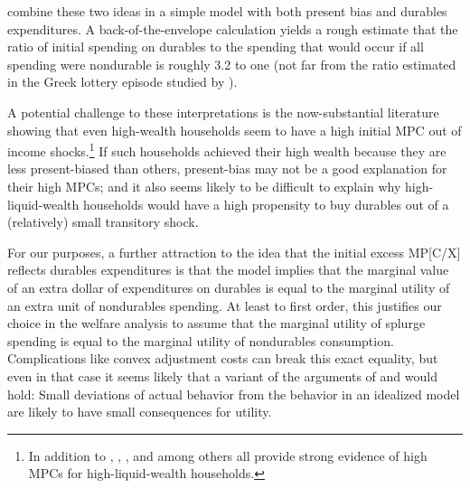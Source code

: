 \documentclass[\econtexRoot/HAFiscal]{subfiles}
\begin{document}
\cite{laibson2022simple} combine these two ideas in a simple model with both present bias and durables expenditures.  A back-of-the-envelope calculation yields a rough estimate that the ratio of initial spending on durables to the spending that would occur if all spending were nondurable is roughly 3.2 to one (not far from the ratio estimated in the Greek lottery episode studied by \cite{kotsogiannisMPCs}).

A potential challenge to these interpretations is the now-substantial literature showing that even high-wealth households seem to have a high initial MPC out of income shocks.\footnote{In addition to \cite{fagereng_mpc_2021}, \cite{graham2024mental}, \cite{crawley2023MicroMacro}, and \cite{kueng2018excess} among others all provide strong evidence of high MPCs for high-liquid-wealth households.}  If such households achieved their high wealth because they are less present-biased than others, present-bias may not be a good explanation for their high MPCs; and it also seems likely to be difficult to explain why high-liquid-wealth households would have a high propensity to buy durables out of a (relatively) small transitory shock.

For our purposes, a further attraction to the idea that the initial excess MP[C/X] reflects durables expenditures is that the \cite{mankiw:durgoods} model implies that the marginal value of an extra dollar of expenditures on durables is equal to the marginal utility of an extra unit of nondurables spending. At least to first order, this justifies our choice in the welfare analysis to assume that the marginal utility of splurge spending is equal to the marginal utility of nondurables consumption.  Complications like convex adjustment costs can break this exact equality, but even in that case it seems likely that a variant of the arguments of \cite{akerlof1985near} and \cite{cochrane1989sensitivity} would hold: Small deviations of actual behavior from the behavior in an idealized model are likely to have small consequences for utility.
\end{document}
